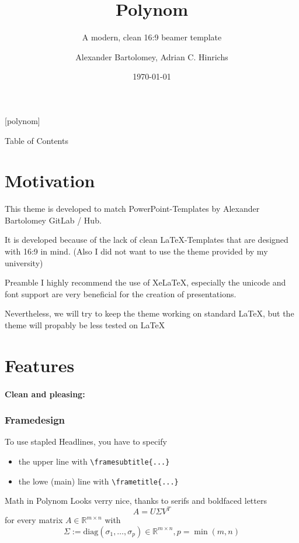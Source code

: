 \documentclass[fragile=singleslide]{beamer}
\title{Polynom}
\subtitle{A modern, clean 16:9 beamer template}
\author{Alexander Bartolomey, Adrian C. Hinrichs}
\date{\today}
\begin{document}
[polynom]{}
\begin{frame}
  \titlepage
\end{frame}

\begin{frame}{Table of Contents}
  \tableofcontents
\end{frame}


\section{Motivation}
\begin{frame}
  This theme is developed to match PowerPoint-Templates by Alexander
  Bartolomey GitLab / Hub.

  It is developed because of the lack of clean LaTeX-Templates that
  are designed with 16:9 in mind.  (Also I did not want to use the
  theme provided by my university)
\end{frame}

\begin{frame}{Preamble}
  I highly recommend the use of XeLaTeX, especially the unicode and
  font support are very beneficial for the creation of presentations.

  Nevertheless, we will try to keep the theme working on standard
  \LaTeX, but the theme will propably be less tested on \LaTeX
\end{frame}

\section{Features}


\begin{frame}
  \framesubtitle{Clean and pleasing:}
  \frametitle{Framedesign}
  To use stapled Headlines, you have to specify
  \begin{itemize}
  \item the upper line with \texttt{\textbackslash framesubtitle\{...\}}
  \item the lowe (main) line with \texttt{\textbackslash frametitle\{...\}}
  \end{itemize}
\end{frame}

\begin{frame}{Math in Polynom}
  Looks verry nice, thanks to serifs and boldfaced letters
   \[ A=U\Sigma V^T\]
   for every matrix \( A\in \mathbb{R}^{m\times n}\) with
   \[\Sigma:=\mathrm{diag}(\sigma_1,\dots,\sigma_p) \in \mathbb{R}^{m\times n}, p = \min(m,n)\]
\end{frame}
\end{document}
